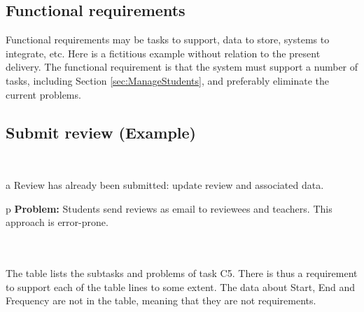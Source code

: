 \documentclass[Main]{subfiles}
\begin{document}
\subsection{Functional requirements}

Functional requirements may be tasks to support, data to store, systems to integrate, etc. 
Here is a fictitious example without relation to the present delivery. 
The functional requirement is that the system must support a number of tasks, including Section \ref{sec:ManageStudents}, and preferably eliminate the current problems.

\subsection{Submit review (Example)}

\colorbox{light-gray}{\begin{minipage}{\textwidth}
\begin{DataIntro}
\end{DataIntro}
\end{minipage}}
\\
\colorbox{light-gray}{\begin{minipage}{\textwidth}
\begin{TaskTable}

\RecordAddi
{a}
{Review has already been submitted: update review and associated data.}{}


\RecordAddi
{p}
{\textbf{Problem:} Students send reviews as email to reviewees and teachers. This approach is error-prone.}{}{}
\end{TaskTable}
\end{minipage}}
\\
\\
The table lists the subtasks and problems of task C5. 
There is thus a requirement to support each of the table lines to some extent. 
The data about Start, End and Frequency are not in the table, meaning that they are not requirements.
\end{document}
